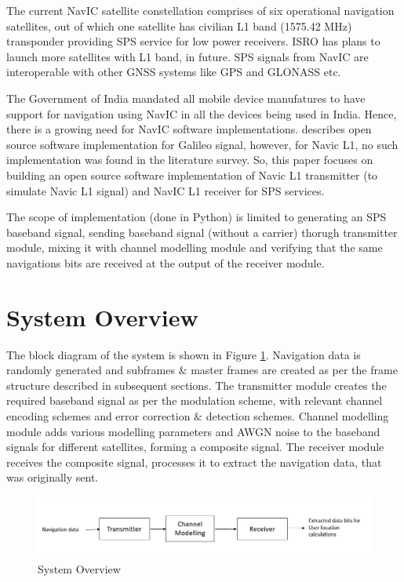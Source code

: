 \documentclass[conference]{IEEEtran}
\begin{document}
The current NavIC satellite constellation comprises of six operational navigation satellites, 
out of which one satellite has civilian L1 band (1575.42 MHz) transponder providing SPS service 
for low power receivers. ISRO has plans to launch more satellites with L1 band, in future. 
SPS signals from NavIC are interoperable with other GNSS systems like GPS and GLONASS etc. 

The Government of India mandated all mobile device manufatures to have support for navigation 
using NavIC in all the devices being used in India. Hence, there is a growing need for NavIC 
software implementations. \cite{b1} describes open source software implementation for Galileo signal,
however, for Navic L1, no such implementation was found in the literature survey. So, this paper 
focuses on building an open source software implementation of Navic L1 transmitter 
(to simulate Navic L1 signal) and NavIC L1 receiver for SPS services. 

The scope of implementation (done in Python) is limited to generating an SPS baseband signal,
sending baseband signal (without a carrier) thorugh transmitter module, mixing it with channel 
modelling module and verifying that the same navigations bits are received at the output of the 
receiver module. 

\section{System Overview}
The block diagram of the system is shown in Figure \ref{fig:sim_flow}. Navigation data is randomly 
generated and subframes $\&$ master frames are created as per the frame structure described in 
subsequent sections. The transmitter module creates the required baseband signal as per the  
modulation scheme, with relevant channel encoding schemes and error correction $\&$ detection schemes. 
Channel modelling module adds various modelling parameters and AWGN noise to the baseband signals 
for different satellites, forming a composite signal. The receiver module receives the composite 
signal, processes it to extract the navigation data, that was originally sent.   


\begin{figure}[ht] 
\centering
\includegraphics[width=1\columnwidth]{figs/simulation_overview.jpg}
\centering
\caption{System Overview}
\label{fig:sim_flow}
\end{figure}
\end{document}

